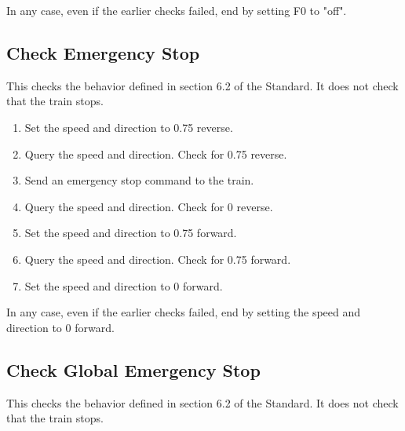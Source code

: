 In any case, even if the earlier checks failed, end by setting F0 to "off".

\subsection{Check Emergency Stop}

This checks the behavior defined in section 6.2 of the Standard.
It does not check that the train stops.

\begin{enumerate}

    \item Set the speed and direction to 0.75 reverse.

    \item Query the speed and direction. Check for 0.75 reverse.

    \item Send an emergency stop command to the train.

    \item Query the speed and direction. Check for 0 reverse.

    \item Set the speed and direction to 0.75 forward.

    \item Query the speed and direction. Check for 0.75 forward.

    \item Set the speed and direction to 0 forward.

\end{enumerate}

In any case, even if the earlier checks failed, end by setting the speed 
and direction to 0 forward.

\subsection{Check Global Emergency Stop}

This checks the behavior defined in section 6.2 of the Standard.
It does not check that the train stops.

